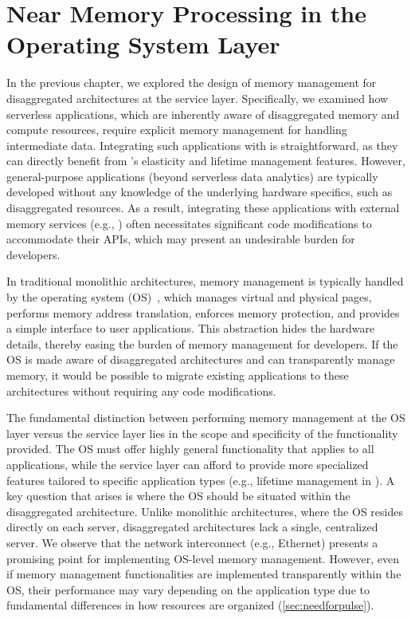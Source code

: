 \chapter{Near Memory Processing in the Operating System Layer}
\label{chap:os}
In the previous chapter, we explored the design of memory management for disaggregated architectures at the service layer. Specifically, we examined how serverless applications, which are inherently aware of disaggregated memory and compute resources, require explicit memory management for handling intermediate data. Integrating such applications with \jiffy is straightforward, as they can directly benefit from \jiffy's elasticity and lifetime management features. However, general-purpose applications (beyond serverless data analytics) are typically developed without any knowledge of the underlying hardware specifics, such as disaggregated resources. As a result, integrating these applications with external memory services (e.g., \jiffy) often necessitates significant code modifications to accommodate their APIs, which may present an undesirable burden for developers.

In traditional monolithic architectures, memory management is typically handled by the operating system (OS)~\cite{memorymanagementsurvey1,memorymanagementsurvey2,memorymanagementsurvey3,memorymanagementsurvey4}, which manages virtual and physical pages, performs memory address translation, enforces memory protection, and provides a simple interface to user applications. This abstraction hides the hardware details, thereby easing the burden of memory management for developers. If the OS is made aware of disaggregated architectures and can transparently manage memory, it would be possible to migrate existing applications to these architectures without requiring any code modifications. 

The fundamental distinction between performing memory management at the OS layer versus the service layer lies in the scope and specificity of the functionality provided. The OS must offer highly general functionality that applies to all applications, while the service layer can afford to provide more specialized features tailored to specific application types (e.g., lifetime management in \jiffy). A key question that arises is where the OS should be situated within the disaggregated architecture. Unlike monolithic architectures, where the OS resides directly on each server, disaggregated architectures lack a single, centralized server. We observe that the network interconnect (e.g., Ethernet) presents a promising point for implementing OS-level memory management. However, even if memory management functionalities are implemented transparently within the OS, their performance may vary depending on the application type due to fundamental differences in how resources are organized (\ref{sec:needforpulse}).

